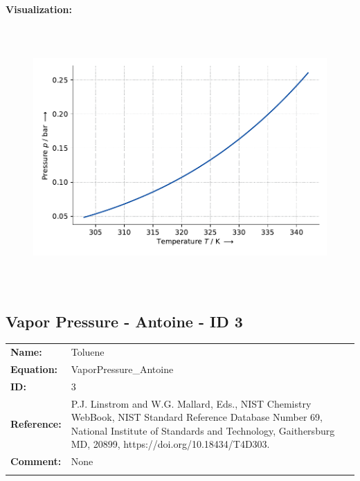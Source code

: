 \textbf{Visualization:}
%
\begin{figure}[!htp]
{\noindent\includegraphics[height=10cm, keepaspectratio]{figs/ref/ref_Toluene_VaporPressure_Antoine_2.pdf}}
\end{figure}
%

\FloatBarrier
\newpage
\subsection{Vapor Pressure - Antoine - ID 3}
%
\begin{tabular}[l]{|lp{11.5cm}|}
\hline
\addlinespace

\textbf{Name:} & Toluene \\
\textbf{Equation:} & VaporPressure\_Antoine \\
\textbf{ID:} & 3 \\
\textbf{Reference:} & P.J. Linstrom and W.G. Mallard, Eds., NIST Chemistry WebBook, NIST Standard Reference Database Number 69, National Institute of Standards and Technology, Gaithersburg MD, 20899, https://doi.org/10.18434/T4D303. \\
\textbf{Comment:} & None \\

\addlinespace
\hline
\end{tabular}
\newline

